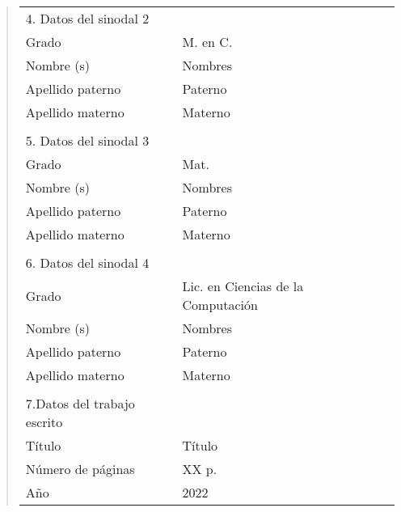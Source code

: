 {\begin{quote}
\begin{tabular}{lll}
4. Datos del sinodal 2      & {}                                          \\
Grado                       & M. en C.                                    \\
Nombre (s)                   & Nombres                                     \\
Apellido paterno            & Paterno                                     \\
Apellido materno            & Materno                                     \\
{}                          & {}                                          \\
5. Datos del sinodal 3      & {}                                          \\
Grado                       & Mat.                                        \\
Nombre (s)                   & Nombres                                     \\
Apellido paterno            & Paterno                                     \\
Apellido materno            & Materno                                     \\
{}                          & {}                                          \\
6. Datos del sinodal 4      & {}                                          \\
Grado                       & Lic. en Ciencias de la Computaci\'on        \\
Nombre (s)                   & Nombres                                     \\
Apellido paterno            & Paterno                                     \\
Apellido materno            & Materno                                     \\
{}                          & {}                                          \\
7.Datos del trabajo escrito & {}                                          \\
T\'itulo                    & T\'itulo                                    \\
N\'umero de p\'aginas       & XX p.                                       \\
A\~no                       & 2022                                        \\
\end{tabular}
\end{quote}
}
